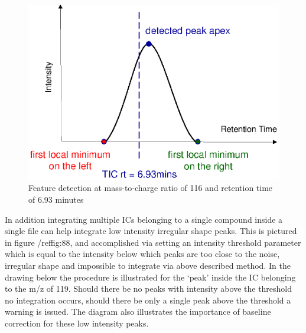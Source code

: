 \begin{figure}
  \begin{center}
    \includegraphics[scale=1]{graphics/chapter08/87.eps}
  \end{center}
  \caption{Feature detection at mass-to-charge ratio of 116 and retention time of 6.93 minutes}
  \label{fig:87}
\end{figure}

In addition integrating multiple ICs belonging to a single compound inside a 
single file can help integrate low intensity irregular shape peaks. This is 
pictured in figure /ref{fig:88}, and accomplished via setting an intensity 
threshold parameter which is equal to the intensity below which peaks are too 
close to the noise, irregular shape and impossible to integrate via above 
described method. In the drawing below the procedure is illustrated for the 
‘peak’ inside the IC belonging to the m/z of 119. Should there be no peaks with 
intensity above the threshold no integration occurs, should there be only a 
single peak above the threshold a warning is issued. The diagram also 
illustrates the importance of baseline correction for these low intensity peaks.

